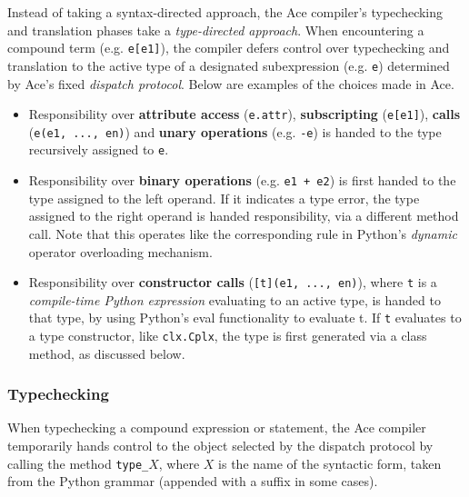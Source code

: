 Instead of taking a syntax-directed approach, the Ace compiler's typechecking and translation phases take a \emph{type-directed approach}. When encountering a compound term (e.g. \verb|e[e1]|), the compiler defers control over typechecking and translation to the active type of a designated subexpression (e.g. \verb|e|) determined by Ace's fixed \emph{dispatch protocol}. Below are examples of the choices made in Ace.
\begin{itemize}
\item Responsibility over {\bf attribute access} (\texttt{e.attr}), {\bf subscripting} (\texttt{e[e1]}),  \textbf{calls} (\verb|e(e1, ..., en)|) and {\bf unary operations} (e.g. \verb|-e|) is handed to the type recursively assigned to \texttt{e}.
\item Responsibility over {\bf binary operations} (e.g. \verb|e1 + e2|) is first handed to the type assigned to the left operand. If it indicates a type error, the type assigned to the right operand is handed responsibility, via a different method call. {Note that this operates like the corresponding rule in Python's \emph{dynamic} operator overloading mechanism.}
\item Responsibility over \textbf{constructor calls} (\verb|[t](e1, ..., en)|), where \verb|t| is a \emph{compile-time Python expression} evaluating to an active type, is handed to that type, by using Python's eval functionality to evaluate t. If \verb|t| evaluates to a type constructor, like \verb|clx.Cplx|, the type is first generated via a class method, as discussed below.
\end{itemize}

\subsubsection{Typechecking}
When typechecking a compound expression or statement, the Ace compiler temporarily hands control to the object selected by the dispatch protocol by calling the method \verb|type_|$X$, where $X$ is  the name of the syntactic form, taken from the Python grammar \cite{python} (appended with a suffix in some cases). 

